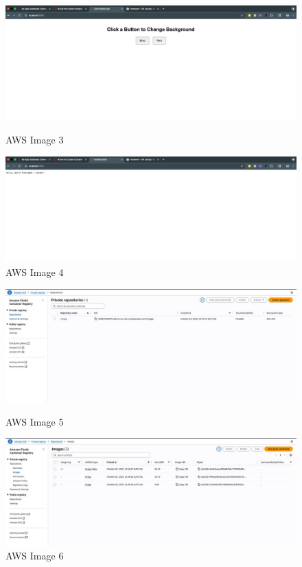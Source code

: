 \begin{figure}[h]
\centering
\begin{minipage}{0.48\textwidth}
  \centering
  \includegraphics[width=\textwidth]{png/aws-screenshot-3.jpeg}
  \caption{AWS Image 3}
  \label{fig:aws-3}
\end{minipage}
\hfill
\begin{minipage}{0.48\textwidth}
  \centering
  \includegraphics[width=\textwidth]{png/aws-screenshot-4.jpeg}
  \caption{AWS Image 4}
  \label{fig:aws-4}
\end{minipage}
\end{figure}

\begin{figure}[h]
\centering
\begin{minipage}{0.48\textwidth}
  \centering
  \includegraphics[width=\textwidth]{png/aws-screenshot-5.jpeg}
  \caption{AWS Image 5}
  \label{fig:aws-5}
\end{minipage}
\hfill
\begin{minipage}{0.48\textwidth}
  \centering
  \includegraphics[width=\textwidth]{png/aws-screenshot-6.jpeg}
  \caption{AWS Image 6}
  \label{fig:aws-6}
\end{minipage}
\end{figure}

